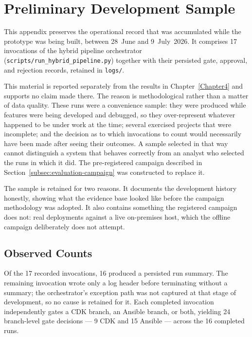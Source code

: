 \appendix

\chapter{Preliminary Development Sample}
\label{app:preliminary-sample}

This appendix preserves the operational record that was accumulated while the
prototype was being built, between 28~June and 9~July~2026. It comprises 17
invocations of the hybrid pipeline orchestrator
(\texttt{scripts/run\_hybrid\_pipeline.py}) together with their persisted gate,
approval, and rejection records, retained in \texttt{logs/}.

This material is reported separately from the results in
Chapter~\ref{Chapter4} and supports no claim made there. The reason is
methodological rather than a matter of data quality. These runs were a
convenience sample: they were produced while features were being developed and
debugged, so they over-represent whatever happened to be under work at the time;
several exercised projects that were incomplete; and the decision as to which
invocations to count would necessarily have been made after seeing their
outcomes. A sample selected in that way cannot distinguish a system that behaves
correctly from an analyst who selected the runs in which it did. The
pre-registered campaign described in
Section~\ref{subsec:evaluation-campaign} was constructed to replace it.

The sample is retained for two reasons. It documents the development history
honestly, showing what the evidence base looked like before the campaign
methodology was adopted. It also contains something the registered campaign does
not: real deployments against a live on-premises host, which the offline
campaign deliberately does not attempt.

\section{Observed Counts}

Of the 17 recorded invocations, 16 produced a persisted run summary. The
remaining invocation wrote only a log header before terminating without a
summary; the orchestrator's exception path was not captured at that stage of
development, so no cause is retained for it. Each completed invocation
independently gates a CDK branch, an Ansible branch, or both, yielding 24
branch-level gate decisions --- 9 CDK and 15 Ansible --- across the 16 completed
runs.

